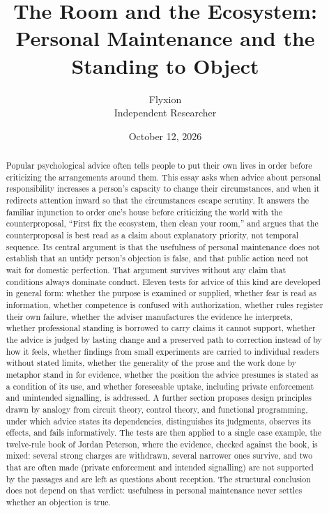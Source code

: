 \documentclass[12pt]{article}
\title{The Room and the Ecosystem:\\
Personal Maintenance and the Standing to Object}
\author{Flyxion\\Independent Researcher}
\date{October 12, 2026}
\begin{document}
\maketitle

\begin{abstract}
\noindent
Popular psychological advice often tells people to put their own lives in order before criticizing the arrangements around them. This essay asks when advice about personal responsibility increases a person's capacity to change their circumstances, and when it redirects attention inward so that the circumstances escape scrutiny. It answers the familiar injunction to order one's house before criticizing the world with the counterproposal, ``First fix the ecosystem, then clean your room,'' and argues that the counterproposal is best read as a claim about explanatory priority, not temporal sequence. Its central argument is that the usefulness of personal maintenance does not establish that an untidy person's objection is false, and that public action need not wait for domestic perfection. That argument survives without any claim that conditions always dominate conduct. Eleven tests for advice of this kind are developed in general form: whether the purpose is examined or supplied, whether fear is read as information, whether competence is confused with authorization, whether rules register their own failure, whether the adviser manufactures the evidence he interprets, whether professional standing is borrowed to carry claims it cannot support, whether the advice is judged by lasting change and a preserved path to correction instead of by how it feels, whether findings from small experiments are carried to individual readers without stated limits, whether the generality of the prose and the work done by metaphor stand in for evidence, whether the position the advice presumes is stated as a condition of its use, and whether foreseeable uptake, including private enforcement and unintended signalling, is addressed. A further section proposes design principles drawn by analogy from circuit theory, control theory, and functional programming, under which advice states its dependencies, distinguishes its judgments, observes its effects, and fails informatively. The tests are then applied to a single case example, the twelve-rule book of Jordan Peterson, where the evidence, checked against the book, is mixed: several strong charges are withdrawn, several narrower ones survive, and two that are often made (private enforcement and intended signalling) are not supported by the passages and are left as questions about reception. The structural conclusion does not depend on that verdict: usefulness in personal maintenance never settles whether an objection is true.
\end{abstract}
\end{document}
